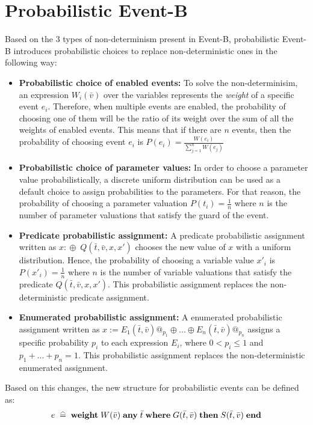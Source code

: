 \section{Probabilistic Event-B}
Based on the 3 types of non-determinism present in Event-B, probabilistic Event-B \cite{Aouadhi2017} introduces probabilistic choices to replace non-deterministic ones in the following way:
\begin{itemize}
    \item \textbf{Probabilistic choice of enabled events:} To solve the non-determinisim, an expression $W_i(\bar{v})$ over the variables represents the \textit{weight} of a specific event $e_i$. Therefore, when multiple events are enabled, the probability of choosing one of them will be the ratio of its weight over the sum of all the weights of enabled events. This means that if there are $n$ events, then the probability of choosing event $e_i$ is $P(e_i) = \frac{W(e_i)}{\sum^{n}_{j = 1}W(e_j)}$
    \item \textbf{Probabilistic choice of parameter values:} In order to choose a parameter value probabilistically, a discrete uniform distribution can be used as a default choice to assign probabilities to the parameters. For that reason, the probability of choosing a parameter valuation $P(t_i) = \frac{1}{n}$ where $n$ is the number of parameter valuations that satisfy the guard of the event.
    \item \textbf{Predicate probabilistic assignment:} A predicate probabilistic assignment written as $x:\! \oplus \; Q(\bar{t}, \bar{v}, x, x')$ chooses the new value of $x$ with a uniform distribution. Hence, the probability of choosing a variable value $x'_i$ is $P(x'_i) = \frac{1}{n}$ where $n$ is the number of variable valuations that satisfy the predicate $Q(\bar{t}, \bar{v}, x, x')$. This probabilistic assignment replaces the non-deterministic predicate assignment. 
    \item \textbf{Enumerated probabilistic assignment:} A enumerated probabilistic assignment written as $x := E_1(\bar{t},\bar{v})@_{p_1}\oplus...\oplus E_n(\bar{t},\bar{v})@_{p_n}$  assigns a specific probability $p_i$ to each expression $E_i$, where $0 < p_i \leq 1$ and $p_1 + ... + p_n = 1$. This probabilistic assignment replaces the non-deterministic enumerated assignment.
\end{itemize}
Based on this changes, the new structure for probabilistic events can be defined as:
\begin{align*}
    e \; \equalhat \; \textbf{weight} \; W( \bar{v}) \; \textbf{any} \; \bar{t} \; \textbf{where} \; G(\bar{t}, \bar{v}) \; \textbf{then} \; S(\bar{t}, \bar{v}) \; \textbf{end} 
\end{align*}
